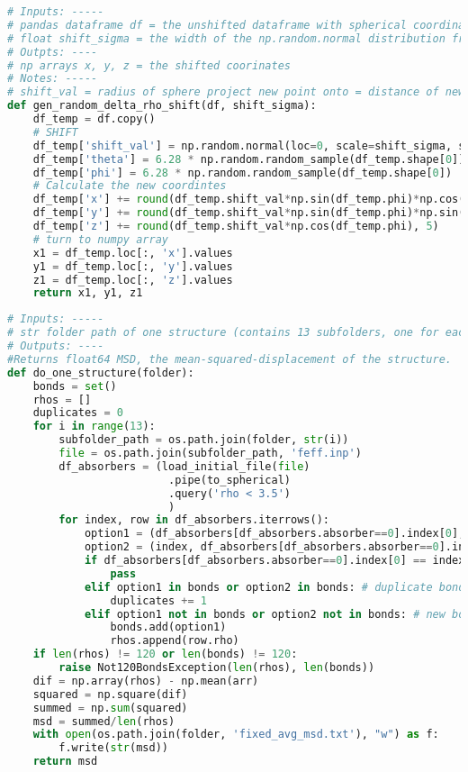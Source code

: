\pagebreak
\begin{lstlisting}[language=Python]
# Inputs: -----
# pandas dataframe df = the unshifted dataframe with spherical coordinates
# float shift_sigma = the width of the np.random.normal distribution from which shift distances are chosen
# Outpts: ----
# np arrays x, y, z = the shifted coorinates
# Notes: -----
# shift_val = radius of sphere project new point onto = distance of new disordered atom from original location
def gen_random_delta_rho_shift(df, shift_sigma):
    df_temp = df.copy()
    # SHIFT
    df_temp['shift_val'] = np.random.normal(loc=0, scale=shift_sigma, size=df_temp.shape[0])
    df_temp['theta'] = 6.28 * np.random.random_sample(df_temp.shape[0])
    df_temp['phi'] = 6.28 * np.random.random_sample(df_temp.shape[0])
    # Calculate the new coordintes
    df_temp['x'] += round(df_temp.shift_val*np.sin(df_temp.phi)*np.cos(df_temp.theta), 5)
    df_temp['y'] += round(df_temp.shift_val*np.sin(df_temp.phi)*np.sin(df_temp.theta), 5)
    df_temp['z'] += round(df_temp.shift_val*np.cos(df_temp.phi), 5)
    # turn to numpy array
    x1 = df_temp.loc[:, 'x'].values
    y1 = df_temp.loc[:, 'y'].values
    z1 = df_temp.loc[:, 'z'].values
    return x1, y1, z1
\end{lstlisting}

\pagebreak
\begin{lstlisting}[language=Python]
# Inputs: -----
# str folder path of one structure (contains 13 subfolders, one for each absober)
# Outputs: ----
#Returns float64 MSD, the mean-squared-displacement of the structure.
def do_one_structure(folder):
    bonds = set()
    rhos = []
    duplicates = 0
    for i in range(13):
        subfolder_path = os.path.join(folder, str(i))
        file = os.path.join(subfolder_path, 'feff.inp')
        df_absorbers = (load_initial_file(file)
                         .pipe(to_spherical)
                         .query('rho < 3.5')
                         )
        for index, row in df_absorbers.iterrows():
            option1 = (df_absorbers[df_absorbers.absorber==0].index[0], index)
            option2 = (index, df_absorbers[df_absorbers.absorber==0].index[0])
            if df_absorbers[df_absorbers.absorber==0].index[0] == index:
                pass
            elif option1 in bonds or option2 in bonds: # duplicate bond found
                duplicates += 1
            elif option1 not in bonds or option2 not in bonds: # new bond found
                bonds.add(option1)
                rhos.append(row.rho)
    if len(rhos) != 120 or len(bonds) != 120:
        raise Not120BondsException(len(rhos), len(bonds))
    dif = np.array(rhos) - np.mean(arr)
    squared = np.square(dif)
    summed = np.sum(squared)
    msd = summed/len(rhos)
    with open(os.path.join(folder, 'fixed_avg_msd.txt'), "w") as f:
        f.write(str(msd))
    return msd
\end{lstlisting}



